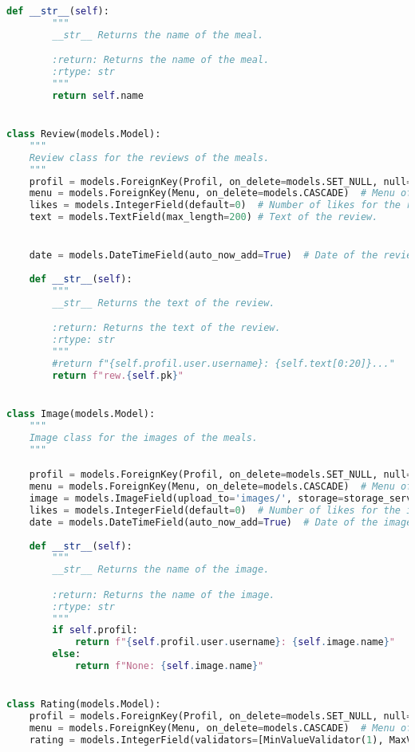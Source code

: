 \begin{lstlisting}[language=Python]
    def __str__(self):
        """
        __str__ Returns the name of the meal.

        :return: Returns the name of the meal.
        :rtype: str
        """
        return self.name


class Review(models.Model):
    """
    Review class for the reviews of the meals.
    """
    profil = models.ForeignKey(Profil, on_delete=models.SET_NULL, null=True)  # Profil of the user who wrote the review. -> If the user doesn't exist anymore, the review is still there.
    menu = models.ForeignKey(Menu, on_delete=models.CASCADE)  # Menu of the meal the review is about. -> If the meal doesn't exist anymore, the review is deleted.
    likes = models.IntegerField(default=0)  # Number of likes for the review.
    text = models.TextField(max_length=200) # Text of the review.


    date = models.DateTimeField(auto_now_add=True)  # Date of the review. Default is the current date.
    
    def __str__(self):
        """
        __str__ Returns the text of the review.

        :return: Returns the text of the review.
        :rtype: str
        """
        #return f"{self.profil.user.username}: {self.text[0:20]}..."
        return f"rew.{self.pk}"


class Image(models.Model):
    """
    Image class for the images of the meals.
    """

    profil = models.ForeignKey(Profil, on_delete=models.SET_NULL, null=True)  # Profil of the user who uploaded the image. -> If the user doesn't exist anymore, the image is still there.
    menu = models.ForeignKey(Menu, on_delete=models.CASCADE)  # Menu of the meal the image is about. -> If the meal doesn't exist anymore, the image is deleted.
    image = models.ImageField(upload_to='images/', storage=storage_service)  # Image of the meal.
    likes = models.IntegerField(default=0)  # Number of likes for the image.
    date = models.DateTimeField(auto_now_add=True)  # Date of the image. Default is the current date.
    
    def __str__(self):
        """
        __str__ Returns the name of the image.

        :return: Returns the name of the image.
        :rtype: str
        """
        if self.profil:
            return f"{self.profil.user.username}: {self.image.name}"
        else:
            return f"None: {self.image.name}"


class Rating(models.Model):
    profil = models.ForeignKey(Profil, on_delete=models.SET_NULL, null=True)  # Profil of the user who rated the meal. -> If the user doesn't exist anymore, the rating is still there.
    menu = models.ForeignKey(Menu, on_delete=models.CASCADE)  # Menu of the meal the rating is about. -> If the meal doesn't exist anymore, the rating is deleted.
    rating = models.IntegerField(validators=[MinValueValidator(1), MaxValueValidator(5)], default=1)  # Rating of the meal.



\end{lstlisting}
